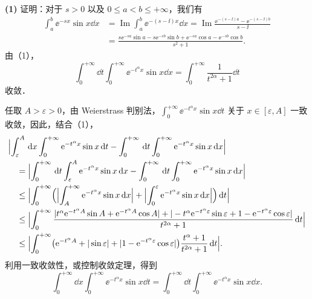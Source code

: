 \begin{solution}
\textbf{(1)} 证明：对于 $s>0$ 以及 $0\le a<b\le+\infty$，我们有
\begin{align*}
  \int_a^b\ee^{-sx}\sin x\dd x
  &=\operatorname{Im}\int_a^b\ee^{-(s-\ii)x}\dd x
   =\operatorname{Im}\frac{\ee^{-(s-\ii)a}-\ee^{-(s-\ii)b}}{s-\ii}\\
  &=\frac{s\ee^{-sa}\sin a-s\ee^{-sb}\sin b+\ee^{-sa}\cos a-\ee^{-sb}\cos b}{s^2+1}.\tag{1}
\end{align*}
由（1），
\[
  \int_0^{+\infty}\dd t\int_0^{+\infty}\ee^{-t^\alpha x}\sin x\dd x=\int_0^{+\infty}\frac{1}{t^{2\alpha}+1}\dd t
\]
收敛．

任取 $A>\varepsilon>0$，由 Weierstrass 判别法，$\displaystyle\int_0^{+\infty}\ee^{-t^\alpha x}\sin x\dd t$ 关于 $x\in[\varepsilon,A]$ 一致收敛，因此，结合（1），
\begin{align*}
  &\Bigl|\int_\varepsilon^A\,\mathrm{d} x\int_0^{+\infty}\mathrm{e}^{-t^\alpha x}\sin x\,\mathrm{d} t
    -\int_0^{+\infty}\,\mathrm{d} t\int_0^{+\infty}\mathrm{e}^{-t^\alpha x}\sin x\,\mathrm{d} x\Bigr|\\
  &\quad=\Bigl|\int_0^{+\infty}\,\mathrm{d} t\int_\varepsilon^A\mathrm{e}^{-t^\alpha x}\sin x\,\mathrm{d} x
    -\int_0^{+\infty}\,\mathrm{d} t\int_0^{+\infty}\mathrm{e}^{-t^\alpha x}\sin x\,\mathrm{d} x\Bigr|\\
  &\quad\le\Bigl|\int_0^{+\infty}\Bigl(\Bigl|\int_A^{+\infty}\mathrm{e}^{-t^\alpha x}\sin x\,\mathrm{d} x\Bigr|
    +\Bigl|\int_0^{\varepsilon}\mathrm{e}^{-t^\alpha x}\sin x\,\mathrm{d} x\Bigr|\Bigr)\,\mathrm{d} t\Bigr|\\
  &\quad\le\Bigl|\int_0^{+\infty}\frac{|t^\alpha\mathrm{e}^{-t^\alpha A}\sin A+\mathrm{e}^{-t^\alpha A}\cos A|
    +|-t^\alpha\mathrm{e}^{-t^\alpha\varepsilon}\sin\varepsilon+1-\mathrm{e}^{-t^\alpha\varepsilon}\cos\varepsilon|}
    {t^{2\alpha}+1}\,\mathrm{d} t\Bigr|\\
  &\quad\le\Bigl|\int_0^{+\infty}\bigl(\mathrm{e}^{-t^\alpha A}+|\sin\varepsilon|
    +|1-\mathrm{e}^{-t^\alpha\varepsilon}\cos\varepsilon|\bigr)\frac{t^\alpha+1}{t^{2\alpha}+1}\,\mathrm{d} t\Bigr|.
\end{align*}
利用一致收敛性，或控制收敛定理，得到
\[
  \int_0^{+\infty}\dd x\int_0^{+\infty}\ee^{-t^\alpha x}\sin x\dd t
  =\int_0^{+\infty}\dd t\int_0^{+\infty}\ee^{-t^\alpha x}\sin x\dd x.
\]


\end{solution}
